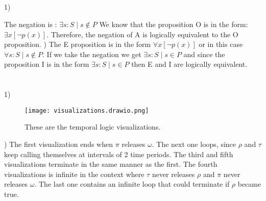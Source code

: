 \documentclass{article}
\begin{document}
\subsection{}
1) \newline

The negation is : $\exists s : S \mid s \notin P$
We know that the proposition O is in the form: $\exists x [\neg p(x)]$. Therefore, the negation of A is logically equivalent to the O proposition.
\newline {})\newline\newline
The E proposition is in the form $\forall x [\neg p(x)]$ or in this case $\forall s : S\mid s\notin P$. If we take the negation we get $\exists s : S \mid s \in P$ and since the proposition I is in the form $\exists s : S \mid s \in P$ then E and I are logically equivalent. 


\newpage
\section{}
\subsection{}
1)\newline
\begin{figure}[h]
    \centering
    \texttt{[image: visualizations.drawio.png]}
    \caption{These are the temporal logic visualizations.}
    \label{fig:temporal1}
\end{figure})\newline\newline
The first visualization ends when $\pi$ releases $\omega$. The next one loops, since $\rho$ and $\tau$ keep calling themselves at intervals of 2 time periods. The third and fifth visualizations terminate in the same manner as the first. The fourth visualizations is infinite in the context where $\tau$ never releases $\rho$ and $\pi$ never releases $\omega$. The last one contains an infinite loop that could terminate if $\rho$ became true.
\end{document}
